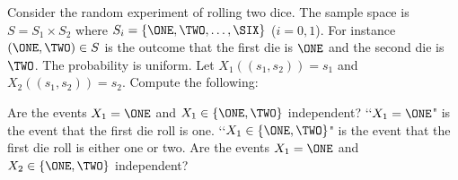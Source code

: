   Consider the random experiment of rolling two dice.
  The sample space is $S = S_1 \times S_2$ where
  $S_i = \{\ONE, \TWO, \ldots, \SIX \}$ ($i = 0, 1$).
  For instance $(\ONE, \TWO) \in S$ is the outcome that the first
  die is $\ONE$ and the second die is $\TWO$.
  The probability is uniform.
  Let $X_1((s_1, s_2)) = s_1$ and $X_2((s_1, s_2)) = s_2$.
  Compute the following:
  \begin{myenum}
    \li Are the events $X_1 = \ONE$ and $X_1 \in \{\ONE, \TWO\}$ independent?
    \lq\lq $X_1 = \ONE$" is the event that the first die roll is one.
    \lq\lq $X_1 \in \{\ONE, \TWO\}$" is the event that the first die roll is either one or two.
    \li Are the events $X_1 = \ONE$ and $X_2 \in \{\ONE, \TWO\}$ independent?
  \end{myenum}
